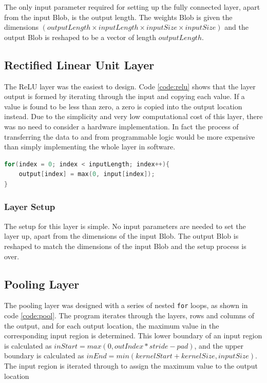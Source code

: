 \documentclass[12pt]{article}
\begin{document}
The only input parameter required for setting up the fully connected layer, apart from the input Blob, is the output length. The weights Blob is given the dimensions $(outputLength \times inputLength \times inputSize \times inputSize)$ and the output Blob is reshaped to be a vector of length $outputLength$. 

\subsection{Rectified Linear Unit Layer}
\label{sec:Design-Relu}

The ReLU layer was the easiest to design. Code \ref{code:relu} shows that the layer output is formed by iterating through the input and copying each value. If a value is found to be less than zero, a zero is copied into the output location instead. Due to the simplicity and very low computational cost of this layer, there was no need to consider a hardware implementation. In fact the process of transferring the data to and from programmable logic would be more expensive than simply implementing the whole layer in software. 

\renewcommand{\lstlistingname}{Code}
\begin{lstlisting}[caption=ReLU layer computation, label=code:relu, language=C, float=ht]
for(index = 0; index < inputLength; index++){
	output[index] = max(0, input[index]);
}
\end{lstlisting} 

\subsubsection{Layer Setup}
\label{sec:Design-Relu-Setup}

The setup for this layer is simple. No input parameters are needed to set the layer up, apart from the dimensions of the input Blob. The output Blob is reshaped to match the dimensions of the input Blob and the setup process is over.

\subsection{Pooling Layer}
\label{sec:Design-Pool}

The pooling layer was designed with a series of nested \lstinline|for| loops, as shown in code \ref{code:pool}. The program iterates through the layers, rows and columns of the output, and for each output location, the maximum value in the corresponding input region is determined. This lower boundary of an input region is calculated as $inStart = max(0, outIndex * stride - pad)$, and the upper boundary is calculated as $inEnd = min(kernelStart + kernelSize, inputSize)$. The input region is iterated through to assign the maximum value to the output location
\end{document}
